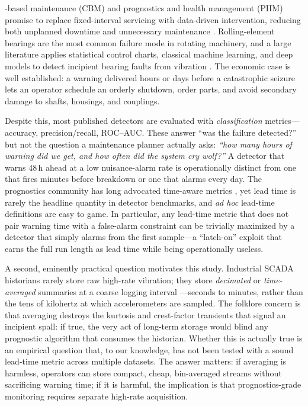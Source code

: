 \documentclass[journal]{IEEEtran}
\begin{document}
-based maintenance (CBM) and prognostics and health
management (PHM) promise to replace fixed-interval servicing with data-driven
intervention, reducing both unplanned downtime and unnecessary maintenance
\cite{jardine2006,lee2014,lei2018}. Rolling-element bearings are the most
common failure mode in rotating machinery, and a large literature applies
statistical control charts, classical machine learning, and deep models to
detect incipient bearing faults from vibration \cite{randall2011,zhao2019}.
The economic case is well established: a warning delivered hours or days before
a catastrophic seizure lets an operator schedule an orderly shutdown, order
parts, and avoid secondary damage to shafts, housings, and couplings.

Despite this, most published detectors are evaluated with
\emph{classification} metrics---accuracy, precision/recall, ROC--AUC. These
answer ``was the failure detected?'' but not the question a maintenance planner
actually asks: \emph{``how many hours of warning did we get, and how often did
the system cry wolf?''} A detector that warns 48\,h ahead at a low
nuisance-alarm rate is operationally distinct from one that fires minutes
before breakdown or one that alarms every day. The prognostics community has
long advocated time-aware metrics \cite{saxena2008,saxena2010,goebel2011}, yet
lead time is rarely the headline quantity in detector benchmarks, and
\emph{ad hoc} lead-time definitions are easy to game. In particular, any
lead-time metric that does not pair warning time with a false-alarm constraint
can be trivially maximized by a detector that simply alarms from the first
sample---a ``latch-on'' exploit that earns the full run length as lead time
while being operationally useless.

A second, eminently practical question motivates this study. Industrial SCADA
historians rarely store raw high-rate vibration; they store \emph{decimated} or
\emph{time-averaged} summaries at a coarse logging interval
\cite{tautz2017}---seconds to minutes, rather than the tens of kilohertz at
which accelerometers are sampled. The folklore concern is that averaging
destroys the kurtosis and crest-factor transients that signal an incipient
spall: if true, the very act of long-term storage would blind any prognostic
algorithm that consumes the historian. Whether this is actually true is an
empirical question that, to our knowledge, has not been tested with a sound
lead-time metric across multiple datasets. The answer matters: if averaging is
harmless, operators can store compact, cheap, bin-averaged streams without
sacrificing warning time; if it is harmful, the implication is that
prognostics-grade monitoring requires separate high-rate acquisition.
\end{document}
